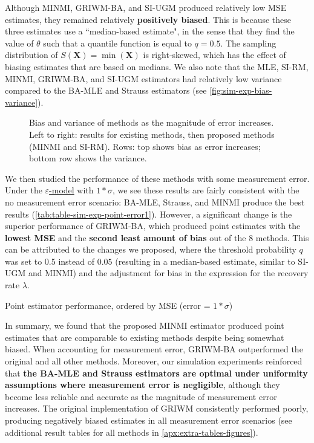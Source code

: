 Although MINMI, GRIWM-BA, and SI-UGM produced relatively low MSE estimates, they remained relatively \textbf{positively biased}. This is because these three estimates use a ``median-based estimate", in the sense that they find the value of $\theta$ such that a quantile function is equal to $q = 0.5$. The sampling distribution of $S(\bm{X}) = \min(\bm{X})$ is right-skewed, which has the effect of biasing estimates that are based on medians. We also note that the MLE, SI-RM, MINMI, GRIWM-BA, and SI-UGM estimators had relatively low variance compared to the BA-MLE and Strauss estimators (see \autoref{fig:sim-exp-bias-variance}).
\begin{figure}[ht]
    \centering
    
    \caption{Bias and variance of methods as the magnitude of error increases. Left to right: results for existing methods, then proposed methods (MINMI and SI-RM). Rows: top shows bias as error increases; bottom row shows the variance.}
    \label{fig:sim-exp-bias-variance}
\end{figure}

We then studied the performance of these methods with some measurement error. Under the  \hyperref[model: measurement-error]{$\varepsilon$-model} with $1*\sigma$, we see these results are fairly consistent with the no measurement error scenario: BA-MLE, Strauss, and MINMI produce the best results (\autoref{tab:table-sim-exp-point-error1}). However, a significant change is the superior performance of GRIWM-BA, which produced point estimates with the \textbf{lowest MSE} and the \textbf{second least amount of bias} out of the 8 methods. This can be attributed to the changes we proposed, where the threshold probability $q$ was set to 0.5 instead of $0.05$ (resulting in a median-based estimate, similar to SI-UGM and MINMI) and the adjustment for bias in the expression for the recovery rate $\lambda$.
\begin{table}[ht]
    \centering
    \caption{Point estimator performance, ordered by MSE (error = $1*\sigma$)}
    
    \label{tab:table-sim-exp-point-error1}
\end{table}

In summary, we found that the proposed MINMI estimator produced point estimates that are comparable to existing methods despite being somewhat biased. When accounting for measurement error, GRIWM-BA outperformed the original and all other methods. Moreover, our simulation experiments reinforced that \textbf{the BA-MLE and Strauss estimators are optimal under uniformity assumptions where measurement error is negligible}, although they become less reliable and accurate as the magnitude of measurement error increases. The original implementation of GRIWM consistently performed poorly, producing negatively biased estimates in all measurement error scenarios (see additional result tables for all methods in \autoref{apx:extra-tables-figures}).

